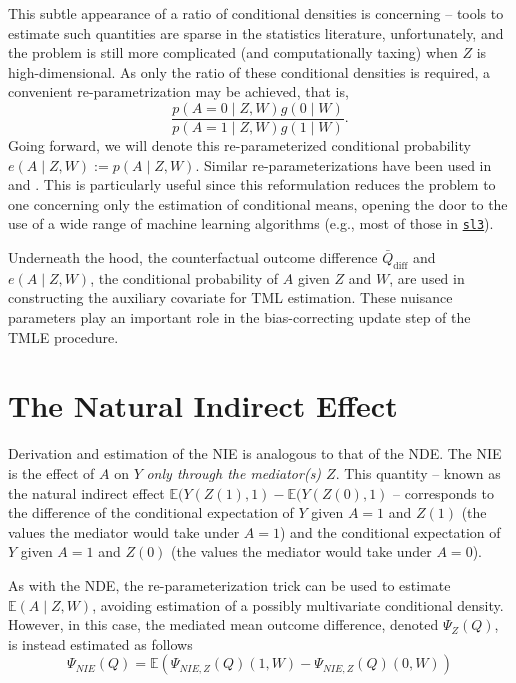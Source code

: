 \documentclass[12pt, krantz2,]{krantz}
\newcommand{\passthrough}[1]{#1}
\theoremstyle{definition}
\theoremstyle{definition}
\theoremstyle{definition}
\newcommand{\E}{\mathbb{E}}
\newcommand{\1}{\mathbbm{1}}
\begin{document}
This subtle appearance of a ratio of conditional densities is concerning --
tools to estimate such quantities are sparse in the statistics literature,
unfortunately, and the problem is still more complicated (and computationally
taxing) when \(Z\) is high-dimensional. As only the ratio of these conditional
densities is required, a convenient re-parametrization may be achieved, that is,
\begin{equation*}
  \frac{p(A = 0 \mid Z, W) g(0 \mid W)}{p(A = 1 \mid Z, W) g(1 \mid W)}.
\end{equation*}
Going forward, we will denote this re-parameterized conditional probability
\(e(A \mid Z, W) := p(A \mid Z, W)\). Similar re-parameterizations have been used
in \citet{zheng2012targeted} and \citet{tchetgen2013inverse}. This is particularly useful
since this reformulation reduces the problem to one concerning only the
estimation of conditional means, opening the door to the use of a wide range of
machine learning algorithms (e.g., most of those in
\href{https://github.com/tlverse/sl3}{\passthrough{\lstinline!sl3!}}).

Underneath the hood, the counterfactual outcome difference
\(\bar{Q}_{\text{diff}}\) and \(e(A \mid Z, W)\), the conditional probability of \(A\)
given \(Z\) and \(W\), are used in constructing the auxiliary covariate for TML
estimation. These nuisance parameters play an important role in the
bias-correcting update step of the TMLE procedure.

\hypertarget{the-natural-indirect-effect}{%
\section{The Natural Indirect Effect}\label{the-natural-indirect-effect}}

Derivation and estimation of the NIE is analogous to that of the NDE. The NIE
is the effect of \(A\) on \(Y\) \emph{only through the mediator(s) \(Z\)}. This quantity
-- known as the natural indirect effect \(\E(Y(Z(1), 1) - \E(Y(Z(0), 1)\) --
corresponds to the difference of the conditional expectation of \(Y\) given \(A = 1\) and \(Z(1)\) (the values the mediator would take under \(A = 1\)) and the
conditional expectation of \(Y\) given \(A = 1\) and \(Z(0)\) (the values the mediator
would take under \(A = 0\)).

As with the NDE, the re-parameterization trick can be used to estimate \(\E(A \mid Z, W)\), avoiding estimation of a possibly multivariate conditional density.
However, in this case, the mediated mean outcome difference, denoted
\(\Psi_Z(Q)\), is instead estimated as follows
\begin{equation*}
  \Psi_{NIE}(Q) = \E (\Psi_{NIE, Z}(Q)(1, W) - \Psi_{NIE, Z}(Q)(0, W))
\end{equation*}
\end{document}
